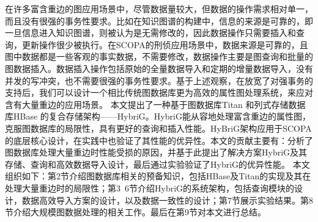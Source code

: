 在许多富含重边的图应用场景中，尽管数据量较大，但数据的操作需求相对单一，而且没有很强的事务性要求。比如在知识图谱的构建中\supercite{knowledge_graph}，信息的来源是可靠的，即一旦信息进入知识图谱，则被认为是无需修改的，因此数据操作只需要插入和查询，更新操作很少被执行。在SCOPA的刑侦应用场景中，数据来源是可靠的，且图中数据都是一些客观的事实数据，不需要修改，数据操作主要是图查询和批量的图数据插入。数据插入操作包括原始的全量数据导入和定期的增量数据导入，没有并发的写冲突，也不需要很强的事务性要求。基于上述观察，在放宽了对强事务的支持后，我们可以设计一个相比传统图数据库更为高效的属性图处理系统，来应对含有大量重边的应用场景。
本文提出了一种基于图数据库Titan 和列式存储数据库HBase 的复合存储架构——HybriG。HybriG能从容地处理富含重边的属性图，克服图数据库的局限性，具有更好的查询和插入性能。HyBriG架构应用于SCOPA的底层核心设计，在实践中也验证了其性能的优异性。本文的贡献主要有：分析了图数据库处理大量重边时性能受损的原因，并基于此提出了解决方案HybriG及其存储、查询和高效数据导入设计，最后通过实验验证了HybriG的优异性能。
本文组织如下：第2节介绍图数据库相关的预备知识，包括HBase及Titan的实现及其在处理大量重边时的局限性；第3~6节介绍HybriG的系统架构，包括查询模块的设计，数据高效导入方案的设计，以及数据一致性的设计；第7节展示实验结果。第8节介绍大规模图数据处理的相关工作。最后在第9节对本文进行总结。


